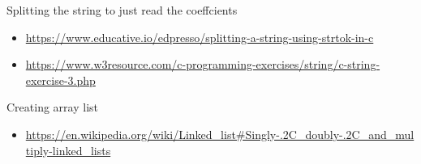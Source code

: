 \documentclass{article}
\begin{document}
Splitting the string to just read the coeffcients
\begin{itemize}
	\item{\url{https://www.educative.io/edpresso/splitting-a-string-using-strtok-in-c}}
	\item{\url{https://www.w3resource.com/c-programming-exercises/string/c-string-exercise-3.php}}
\end{itemize}

Creating array list 
\begin{itemize}
	\item{\url{https://en.wikipedia.org/wiki/Linked_list#Singly-.2C_doubly-.2C_and_multiply-linked_lists}}
\end{itemize}
\end{document}
